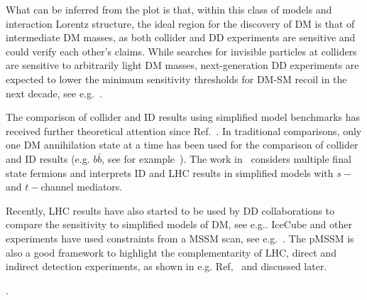 What can be inferred from the plot is that, within this class of models and interaction Lorentz structure, %
the ideal region for the discovery of DM is that of intermediate DM masses, as both collider and DD experiments are sensitive and could verify each other's claims. While searches for invisible particles at colliders are sensitive to arbitrarily light DM masses, next-generation DD experiments are expected to lower the minimum sensitivity thresholds for DM-SM recoil in the next decade, see e.g.~\cite{Agnese:2016cpb}. 

The comparison of collider and ID results using simplified model benchmarks has received further theoretical attention since Ref.~\cite{Boveia:2016mrp}. In traditional comparisons, only one DM annihilation state at a time has been used for the comparison of collider and ID results (e.g. $b\bar{b}$, see for example~\cite{Agrawal:2014una}). The work in~\cite{Carpenter:2016thc} considers multiple final state fermions and interprets ID and LHC results in simplified models with $s-$ and $t-$channel mediators. 

Recently, LHC results have also started to be used by DD collaborations to compare the sensitivity to simplified models of DM, see e.g.\cite{PhysRevLett.118.251301,Balazs:2017hxh}. IceCube and other experiments have used constraints from a MSSM scan, see e.g.~\cite{Aartsen:2016zhm}. The pMSSM is also a good framework to highlight the complementarity of LHC, direct and indirect detection experiments, as shown in e.g. Ref,~\cite{Cahill-Rowley:2014twa} and discussed later. %

\begin{marginnote}[]
\end{marginnote}. 

